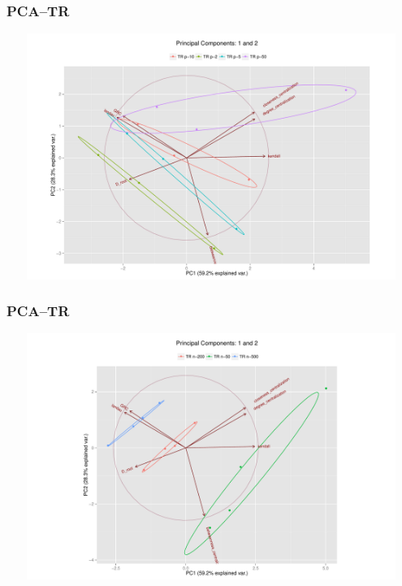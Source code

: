 \documentclass[xcolor={table}]{beamer}
\newenvironment{changemargin}[2]{%
  \begin{list}{}{%
    \setlength{\topsep}{0pt}%
    \setlength{\leftmargin}{#1}%
    \setlength{\rightmargin}{#2}%
    \setlength{\listparindent}{\parindent}%
    \setlength{\itemindent}{\parindent}%
    \setlength{\parsep}{\parskip}%
  }%
  \item[]}{\end{list}}
\begin{document}
\begin{frame}\frametitle{PCA--TR}
	\begin{changemargin}{-2cm}{ -2cm}
		\centering
		\par
		\includegraphics[width=15cm, height=8cm]{images/TR_Param_PCA_Components1_2.pdf}
	\end{changemargin}
\end{frame}

\begin{frame}\frametitle{PCA--TR}
	\begin{changemargin}{-2cm}{ -2cm}
		\centering
		\par
		\includegraphics[width=15cm, height=8cm]{images/TR_Size_PCA_Components1_2.pdf}
	\end{changemargin}
\end{frame}
\end{document}
